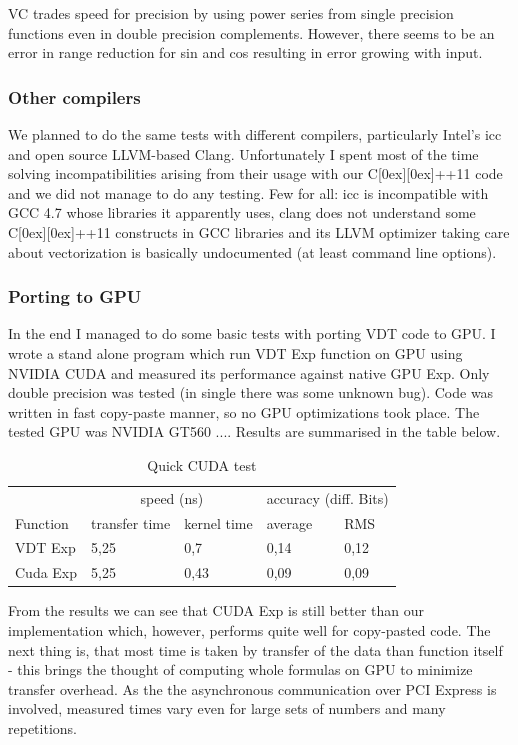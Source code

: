 \documentclass[oneside,10pt,a4paper]{article}
\newcommand{\Cpp}{C\raisebox{0.15ex}[0ex][0ex]{++}}
\begin{document}
VC trades speed for precision by using power series from single precision functions even in double precision complements. However, there seems to be an error in range reduction for sin and cos resulting in error growing with input.

\subsubsection{Other compilers}
We planned to do the same tests with different compilers, particularly Intel's icc and open source LLVM-based Clang. Unfortunately I spent most of the time solving incompatibilities arising from their usage with our \Cpp 11 code and we did not manage to do any testing. Few for all: icc is incompatible with GCC 4.7 whose libraries it apparently uses, clang does not understand some \Cpp 11 constructs in GCC libraries and its LLVM optimizer taking care about vectorization is basically undocumented (at least command line options).

\subsubsection{Porting to GPU}
In the end I managed to do some basic tests with porting VDT code to GPU. I wrote a stand alone program which run VDT Exp function on GPU using NVIDIA CUDA and measured its performance against native GPU Exp. Only double precision was tested (in single there was some unknown bug). Code was written in fast copy-paste manner, so no GPU optimizations took place. The tested GPU was NVIDIA GT560 .... Results are summarised in the table below.
\begin{table}[h]
    \begin{center}
    \begin{tabular}{lllll}
      \toprule
    &\multicolumn{2}{c}{speed (ns)}&\multicolumn{2}{c}{accuracy (diff. Bits)}\\
    Function & transfer time & kernel time & average & RMS\\
    \midrule
    VDT Exp&5,25&0,7&0,14&0,12\\
    Cuda Exp&5,25&0,43&0,09&0,09\\
    \bottomrule
    \end{tabular}
    \caption{Quick CUDA test}
    \label{cuda}
    \end{center}
\end{table}

From the results we can see that CUDA Exp is still better than our implementation which, however, performs quite well for copy-pasted code. The next thing is, that most time is taken by transfer of the data than function itself - this brings the thought of computing whole formulas on GPU to minimize transfer overhead. As the the asynchronous communication over PCI Express is involved, measured times vary even for large sets of numbers and many repetitions.
\end{document}
